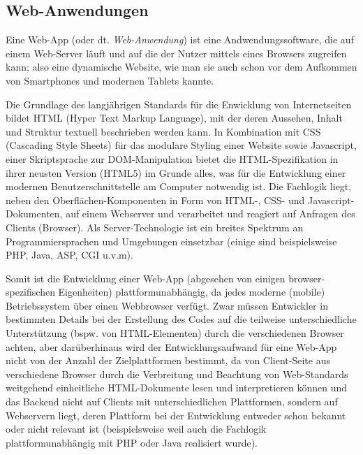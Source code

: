 \subsection{Web-Anwendungen}

Eine Web-App (oder dt. \emph{Web-Anwendung}) ist eine Andwendungssoftware, die auf einem Web-Server läuft und auf die der Nutzer mittels eines Browsers zugreifen kann; also eine dynamische Website, wie man sie auch schon vor dem Aufkommen von Smartphones und modernen Tablets kannte. 

Die Grundlage des langjährigen Standards für die Enwicklung von Internetseiten bildet HTML (Hyper Text Markup Language), mit der deren Aussehen, Inhalt und Struktur textuell beschrieben werden kann. In Kombination mit CSS (Cascading Style Sheets) für das modulare Styling einer Website sowie Javascript, einer Skriptsprache zur DOM-Manipulation bietet die HTML-Spezifikation in ihrer neusten Version (HTML5) im Grunde alles, was für die Entwicklung einer modernen Benutzerschnittstelle am Computer notwendig ist. 
Die Fachlogik liegt, neben den Oberflächen-Komponenten in Form von HTML-, CSS- und Javascript-Dokumenten, auf einem Webserver und verarbeitet und reagiert auf Anfragen des Clients (Browser).
Als Server-Technologie ist ein breites Spektrum an Programmiersprachen und Umgebungen einsetzbar (einige sind beispielsweise PHP, Java, ASP, CGI u.v.m).

Somit ist die Entwicklung einer Web-App (abgesehen von einigen browser-spezifischen Eigenheiten) plattformunabhängig, da jedes moderne (mobile) Betriebssystem über einen Webbrowser verfügt. 
Zwar müssen Entwickler in bestimmten Details bei der Erstellung des Codes auf die teilweise unterschiedliche Unterstützung (bspw. von HTML-Elementen) durch die verschiedenen Browser achten, aber darüberhinaus wird der Entwicklungsaufwand für eine Web-App nicht von der Anzahl der Zielplattformen bestimmt, da von Client-Seite aus verschiedene Browser durch die Verbreitung und Beachtung von Web-Standards weitgehend einheitliche HTML-Dokumente lesen und interpretieren können und das Backend nicht auf Clients mit unterschiedlichen Plattformen, sondern auf Webservern liegt, deren Plattform bei der Entwicklung entweder schon bekannt oder nicht relevant ist (beispielsweise weil auch die Fachlogik plattformunabhängig mit PHP oder Java realisiert wurde).

